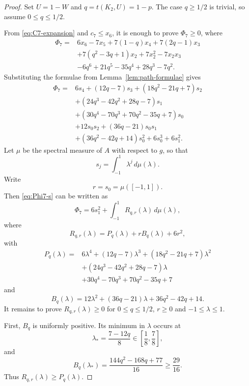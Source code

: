 \documentclass[11pt]{article}
\begin{document}
\begin{proof}
Set $U=1-W$ and $q=t(K_2,U)=1-p$.  The case $q\ge1/2$ is trivial, so assume $0\le q\le1/2$.

From \eqref{eq:C7-expansion} and $c_7\le x_6$, it is enough to prove $\Phi_7\ge0$, where
\begin{equation}\label{eq:Phi7-path}
\begin{aligned}
\Phi_7={}&
6x_6-7x_5
+7(1-q)x_4
+7(2q-1)x_3 \\
&+7(q^2-3q+1)x_2
+7x_2^2-7x_2x_3 \\
&-6q^6+21q^5-35q^4+28q^3-7q^2.
\end{aligned}
\end{equation}
Substituting the formulae from Lemma~\ref{lem:path-formulae} gives
\begin{equation}\label{eq:Phi7-s}
\begin{aligned}
\Phi_7={}&
6s_4+(12q-7)s_3+(18q^2-21q+7)s_2\\
&+(24q^3-42q^2+28q-7)s_1\\
&+(30q^4-70q^3+70q^2-35q+7)s_0\\
&+12s_0s_2+(36q-21)s_0s_1\\
&+(36q^2-42q+14)s_0^2+6s_0^3+6s_1^2.
\end{aligned}
\end{equation}
Let $\mu$ be the spectral measure of $A$ with respect to $g$, so that
\[
        s_j=\int_{-1}^1\lambda^j\,d\mu(\lambda).
\]
Write
\[
        r=s_0=\mu([-1,1]).
\]
Then \eqref{eq:Phi7-s} can be written as
\[
        \Phi_7=6s_1^2+
        \int_{-1}^1 R_{q,r}(\lambda)\,d\mu(\lambda),
\]
where
\[
        R_{q,r}(\lambda)=P_q(\lambda)+rB_q(\lambda)+6r^2,
\]
with
\[
\begin{aligned}
P_q(\lambda)={}&
6\lambda^4+(12q-7)\lambda^3+(18q^2-21q+7)\lambda^2\\
&+(24q^3-42q^2+28q-7)\lambda\\
&+30q^4-70q^3+70q^2-35q+7
\end{aligned}
\]
and
\[
        B_q(\lambda)=12\lambda^2+(36q-21)\lambda+36q^2-42q+14.
\]
It remains to prove $R_{q,r}(\lambda)\ge0$ for $0\le q\le1/2$, $r\ge0$ and $-1\le\lambda\le1$.

First, $B_q$ is uniformly positive.  Its minimum in $\lambda$ occurs at
\[
        \lambda_*=\frac{7-12q}{8}\in\left[\frac18,\frac78\right],
\]
and
\[
        B_q(\lambda_*)=\frac{144q^2-168q+77}{16}\ge \frac{29}{16}.
\]
Thus $R_{q,r}(\lambda)\ge P_q(\lambda)$.


\end{proof}
\end{document}
